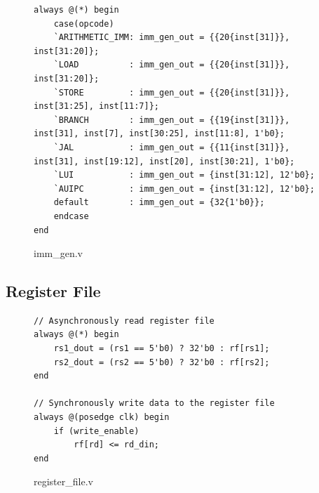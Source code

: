 \documentclass[openright, a4paper]{article}
\begin{document}
\begin{figure}[!h]
    \begin{verbatim}
always @(*) begin
    case(opcode)
    `ARITHMETIC_IMM: imm_gen_out = {{20{inst[31]}}, inst[31:20]};
    `LOAD          : imm_gen_out = {{20{inst[31]}}, inst[31:20]};
    `STORE         : imm_gen_out = {{20{inst[31]}}, inst[31:25], inst[11:7]};
    `BRANCH        : imm_gen_out = {{19{inst[31]}}, inst[31], inst[7], inst[30:25], inst[11:8], 1'b0};
    `JAL           : imm_gen_out = {{11{inst[31]}}, inst[31], inst[19:12], inst[20], inst[30:21], 1'b0};
    `LUI           : imm_gen_out = {inst[31:12], 12'b0};
    `AUIPC         : imm_gen_out = {inst[31:12], 12'b0};
    default        : imm_gen_out = {32{1'b0}};
    endcase
end
    \end{verbatim}
    \caption{imm_gen.v}
\end{figure}

\subsection{Register File}

\begin{figure}[h]
    \begin{verbatim}
// Asynchronously read register file
always @(*) begin
    rs1_dout = (rs1 == 5'b0) ? 32'b0 : rf[rs1];
    rs2_dout = (rs2 == 5'b0) ? 32'b0 : rf[rs2];
end

// Synchronously write data to the register file
always @(posedge clk) begin
    if (write_enable)
        rf[rd] <= rd_din;
end
    \end{verbatim}
    \caption{register_file.v}
\end{figure}

\newpage
\end{document}

